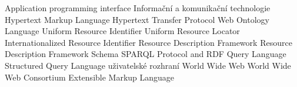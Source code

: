  {Application programming interface}
 {Informační a komunikační technologie}
 {Hypertext Markup Language}
 {Hypertext Transfer Protocol}
 {Web Ontology Language}
 {Uniform Resource Identifier}
 {Uniform Resource Locator}
 {Internationalized Resource Identifier}
 {Resource Description Framework}
 {Resource Description Framework Schema}
 {SPARQL Protocol and RDF Query Language}
 {Structured Query Language}
 {uživatelské rozhraní}
 {World Wide Web}
 {World Wide Web Consortium}
 {Extensible Markup Language}
